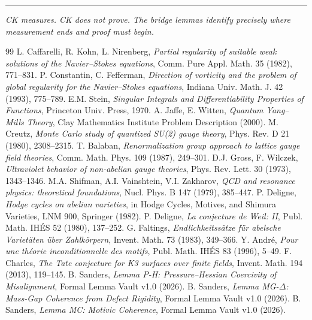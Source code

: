 \documentclass[11pt]{article}
\theoremstyle{definition}
\begin{document}
\bigskip
\hrule
\bigskip
\noindent\textit{CK measures. CK does not prove.  The bridge lemmas identify precisely
where measurement ends and proof must begin.}

\begin{thebibliography}{99}
 L. Caffarelli, R. Kohn, L. Nirenberg, \textit{Partial regularity of suitable weak solutions of the Navier--Stokes equations}, Comm. Pure Appl. Math. 35 (1982), 771--831.
 P. Constantin, C. Fefferman, \textit{Direction of vorticity and the problem of global regularity for the Navier--Stokes equations}, Indiana Univ. Math. J. 42 (1993), 775--789.
 E.M. Stein, \textit{Singular Integrals and Differentiability Properties of Functions}, Princeton Univ. Press, 1970.
 A. Jaffe, E. Witten, \textit{Quantum Yang--Mills Theory}, Clay Mathematics Institute Problem Description (2000).
 M. Creutz, \textit{Monte Carlo study of quantized SU(2) gauge theory}, Phys. Rev. D 21 (1980), 2308--2315.
 T. Balaban, \textit{Renormalization group approach to lattice gauge field theories}, Comm. Math. Phys. 109 (1987), 249--301.
 D.J. Gross, F. Wilczek, \textit{Ultraviolet behavior of non-abelian gauge theories}, Phys. Rev. Lett. 30 (1973), 1343--1346.
 M.A. Shifman, A.I. Vainshtein, V.I. Zakharov, \textit{QCD and resonance physics: theoretical foundations}, Nucl. Phys. B 147 (1979), 385--447.
 P. Deligne, \textit{Hodge cycles on abelian varieties}, in Hodge Cycles, Motives, and Shimura Varieties, LNM 900, Springer (1982).
 P. Deligne, \textit{La conjecture de Weil: II}, Publ. Math. IH\'ES 52 (1980), 137--252.
 G. Faltings, \textit{Endlichkeitss\"atze f\"ur abelsche Variet\"aten \"uber Zahlk\"orpern}, Invent. Math. 73 (1983), 349--366.
 Y. Andr\'e, \textit{Pour une th\'eorie inconditionnelle des motifs}, Publ. Math. IH\'ES 83 (1996), 5--49.
 F. Charles, \textit{The Tate conjecture for K3 surfaces over finite fields}, Invent. Math. 194 (2013), 119--145.
 B. Sanders, \textit{Lemma P-H: Pressure--Hessian Coercivity of Misalignment}, Formal Lemma Vault v1.0 (2026).
 B. Sanders, \textit{Lemma MG-$\Delta$: Mass-Gap Coherence from Defect Rigidity}, Formal Lemma Vault v1.0 (2026).
 B. Sanders, \textit{Lemma MC: Motivic Coherence}, Formal Lemma Vault v1.0 (2026).
\end{thebibliography}
\end{document}
